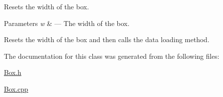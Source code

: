 Resets the width of the box. 


\begin{DoxyParams}{Parameters}
{\em w} & --- The width of the box.\\
\hline
\end{DoxyParams}
Resets the width of the box and then calls the data loading method. 

The documentation for this class was generated from the following files\+:\begin{DoxyCompactItemize}
\item 
\hyperlink{_box_8h}{Box.\+h}\item 
\hyperlink{_box_8cpp}{Box.\+cpp}\end{DoxyCompactItemize}
